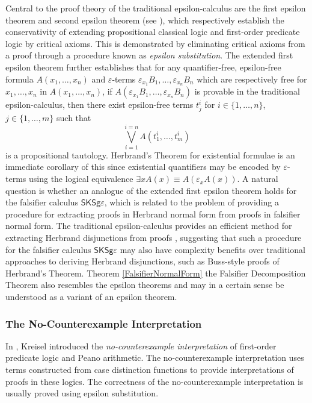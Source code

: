 \documentclass[10pt]{article}
\theoremstyle{definition}\newtheorem{remark}[theorem]{Remark}
\theoremstyle{definition}\newtheorem{example}[theorem]{Example}
\theoremstyle{definition}\newtheorem{definition}[theorem]{Definition}
\newcommand{\FalsifierCalculus}{{\mathsf{SKSg\varepsilon}}}
\begin{document}
	Central to the proof theory of the traditional epsilon-calculus are the first epsilon theorem and second epsilon theorem (see \cite{MoserZachEpsilonCalculusAndHerbrand}), which respectively establish the conservativity of extending propositional classical logic and first-order predicate logic by critical axioms. This is demonstrated by eliminating critical axioms from a proof through a procedure known as \textit{epsilon substitution}. The extended first epsilon theorem \cite{BaazEpsilon, MoserZachEpsilonCalculusAndHerbrand} further establishes that for any quantifier-free, epsilon-free formula $A(x_1, \dots, x_n)$ and $\varepsilon$-terms $\varepsilon_{x_1} B_1, \dots, \varepsilon_{x_n} B_n$ which are respectively free for $x_1, \dots, x_n$ in $A(x_1, \dots, x_n)$, if $A(\varepsilon_{x_1} B_1, \dots, \varepsilon_{x_n} B_n)$ is provable in the traditional epsilon-calculus, then there exist epsilon-free terms $t_j^i$ for $i \in \{1, \dots, n\}$, $j \in \{1, \dots, m\}$ such that
	\[
		\bigvee\limits_{i = 1}^{i=n} A(t_1^i, \dots, t_m^i)
	\]
	is a propositional tautology. Herbrand's Theorem for existential formulae is an immediate corollary of this since existential quantifiers may be encoded by $\varepsilon$-terms using the logical equivalence $\exists x A(x) \equiv A(\varepsilon_x A(x))$. A natural question is whether an analogue of the extended first epsilon theorem holds for the falsifier calculus $\FalsifierCalculus$, which is related to the problem of providing a procedure for extracting proofs in Herbrand normal form from proofs in falsifier normal form. The traditional epsilon-calculus provides an efficient method for extracting Herbrand disjunctions from proofs \cite{BaazEpsilon}, suggesting that such a procedure for the falsifier calculus $\FalsifierCalculus$ may also have complexity benefits over traditional approaches to deriving Herbrand disjunctions, such as Buss-style proofs of Herbrand's Theorem. Theorem \ref{FalsifierNormalForm} the Falsifier Decomposition Theorem also resembles the epsilon theorems and may in a certain sense be understood as a variant of an epsilon theorem.
	
	\subsubsection*{The No-Counterexample Interpretation}
	
	In \cite{KreiselNoCounterexample1, KreiselNoCounterexample2}, Kreisel introduced the \textit{no-counterexample interpretation} of first-order predicate logic and Peano arithmetic. The no-counterexample interpretation uses terms constructed from case distinction functions to provide interpretations of proofs in these logics. The correctness of the no-counterexample interpretation is usually proved using epsilon substitution.
	
\end{document}
